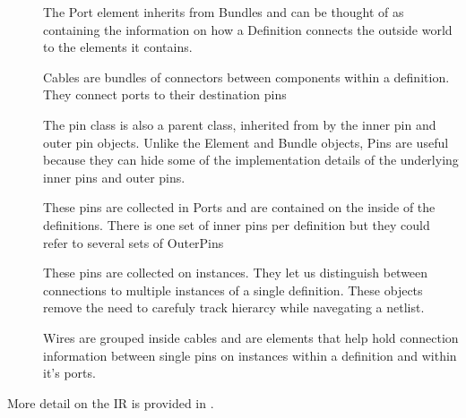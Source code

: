 \documentclass[letterpaper,10pt,english,openany,oneside]{sphinxmanual}
\begin{document}
\begin{description}
\item[{{\hyperref[\detokenize{reference/classes/port:spydrnet.Port}]{}}}] \leavevmode
The Port element inherits from Bundles and can be thought of as containing the information on how a Definition connects the outside world to the elements it contains.

\item[{{\hyperref[\detokenize{reference/classes/cable:spydrnet.Cable}]{}}}] \leavevmode
Cables are bundles of connectors between components within a definition. They connect ports to their destination pins

\item[{}] \leavevmode
The pin class is also a parent class, inherited from by the inner pin and outer pin objects. Unlike the Element and Bundle objects, Pins are useful because they can hide some of the implementation details of the underlying inner pins and outer pins.

\item[{{\hyperref[\detokenize{reference/classes/innerpin:spydrnet.InnerPin}]{}}}] \leavevmode
These pins are collected in Ports and are contained on the inside of the definitions. There is one set of inner pins per definition but they could refer to several sets of OuterPins

\item[{{\hyperref[\detokenize{reference/classes/outerpin:spydrnet.OuterPin}]{}}}] \leavevmode
These pins are collected on instances. They let us distinguish between connections to multiple instances of a single definition. These objects remove the need to carefuly track hierarcy while navegating a netlist.

\item[{{\hyperref[\detokenize{reference/classes/wire:spydrnet.Wire}]{}}}] \leavevmode
Wires are grouped inside cables and are elements that help hold connection information between single pins on instances within a definition and within it’s ports.

\end{description}

More detail on the IR is provided in {\hyperref[\detokenize{reference/classes/index:api-summary}]{}}.
\end{document}
